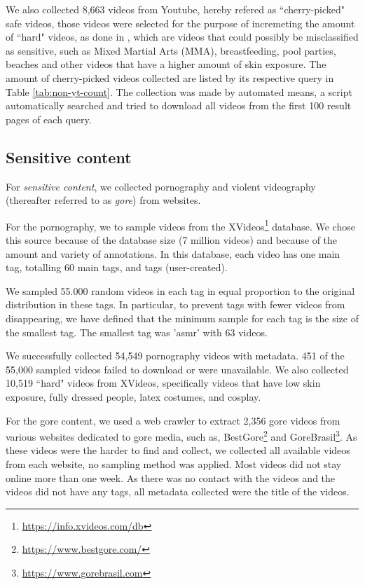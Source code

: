 We also collected 8,663 videos from Youtube, hereby refered as ``cherry-picked" safe videos, those videos were selected for the purpose of incremeting the amount of ``hard" videos, as done in \cite{2kdataset}, which are videos that could possibly be misclassified as sensitive, such as Mixed Martial Arts (MMA), breastfeeding, pool parties, beaches and other videos that have a higher amount of skin exposure. The amount of cherry-picked videos collected are listed by its respective query in Table \ref{tab:non-yt-count}. The collection was made by automated means, a script automatically searched and tried to download all videos from the first 100 result pages of each query.

\subsection{Sensitive content}\label{subsec:dataset-sensitive}

For \textit{sensitive content}, we collected pornography and violent videography (thereafter referred to as \textit{gore}) from websites. 

For the pornography, we to sample videos from the XVideos\footnote{\url{https://info.xvideos.com/db}} database. We chose this source because of the database size (7 million videos) and because of the amount and variety of annotations. In this database, each video has one main tag, totalling 60 main tags, and tags (user-created). 

We sampled 55.000 random videos in each tag in equal proportion to the original distribution in these tags. In particular, to prevent tags with fewer videos from disappearing, we have defined that the minimum sample for each tag is the size of the smallest tag. The smallest tag was 'asmr' with 63 videos.

We successfully collected 54,549 pornography videos with metadata. 451 of the 55,000 sampled videos failed to download or were unavailable. We also collected 10,519 ``hard" videos from XVideos, specifically videos that have low skin exposure, fully dressed people, latex costumes, and cosplay. %

For the gore content, we used a web crawler to extract 2,356 gore videos from various websites dedicated to gore media, such as, BestGore\footnote{\url{https://www.bestgore.com/}} and GoreBrasil\footnote{\url{https://www.gorebrasil.com}}. As these videos were the harder to find and collect, we collected all available videos from each website, no sampling method was applied. Most videos did not stay online more than one week. As there was no contact with the videos and the videos did not have any tags, all metadata collected were the title of the videos. 

